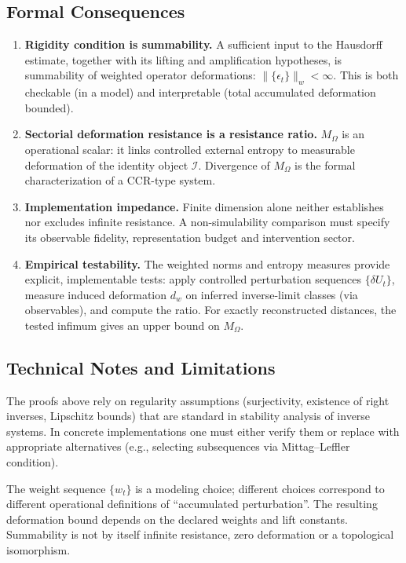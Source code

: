 \documentclass[11pt,a4paper]{article}
\theoremstyle{plain}
\theoremstyle{definition}
\theoremstyle{remark}
\begin{document}
\subsection{Formal Consequences}

\begin{enumerate}[leftmargin=*]
    \item \textbf{Rigidity condition is summability.} A sufficient input to the Hausdorff estimate, together with its lifting and amplification hypotheses, is summability of weighted operator deformations: $\|\{\epsilon_t\}\|_w < \infty$. This is both checkable (in a model) and interpretable (total accumulated deformation bounded).
    
    \item \textbf{Sectorial deformation resistance is a resistance ratio.} $M_\Omega$ is an operational scalar: it links controlled external entropy to measurable deformation of the identity object $\mathcal{I}$. Divergence of $M_\Omega$ is the formal characterization of a CCR-type system.
    
    \item \textbf{Implementation impedance.} Finite dimension alone neither establishes nor excludes infinite resistance. A non-simulability comparison must specify its observable fidelity, representation budget and intervention sector.
    
    \item \textbf{Empirical testability.} The weighted norms and entropy measures provide explicit, implementable tests: apply controlled perturbation sequences $\{\delta U_t\}$, measure induced deformation $d_w$ on inferred inverse-limit classes (via observables), and compute the ratio. For exactly reconstructed distances, the tested infimum gives an upper bound on $M_\Omega$.
\end{enumerate}

\subsection{Technical Notes and Limitations}

The proofs above rely on regularity assumptions (surjectivity, existence of right inverses, Lipschitz bounds) that are standard in stability analysis of inverse systems. In concrete implementations one must either verify them or replace with appropriate alternatives (e.g., selecting subsequences via Mittag--Leffler condition).

The weight sequence $\{w_t\}$ is a modeling choice; different choices correspond to different operational definitions of ``accumulated perturbation''. The resulting deformation bound depends on the declared weights and lift constants. Summability is not by itself infinite resistance, zero deformation or a topological isomorphism.
\end{document}
